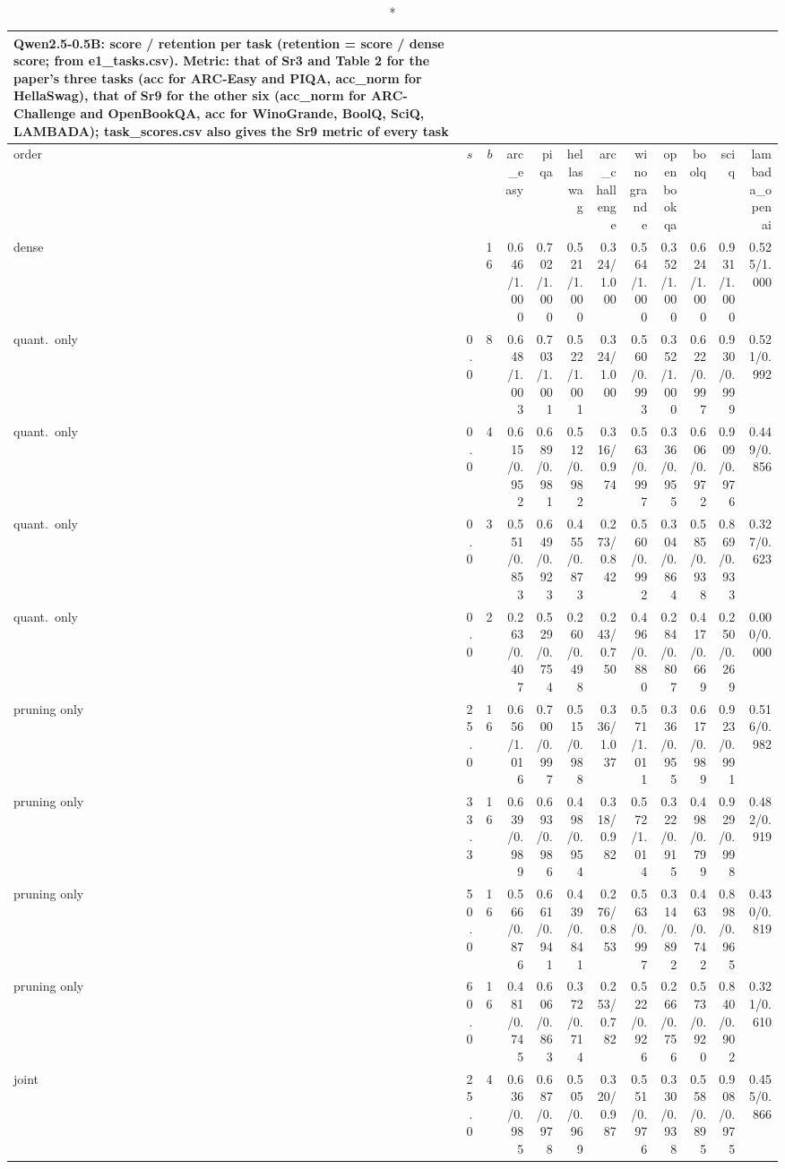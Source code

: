 \documentclass{article}
\begin{document}
\begin{longtable}{lrrrrrrrrrrr}
\caption*{Qwen2.5-0.5B: score / retention per task (retention = score / dense score; from e1\_tasks.csv). Metric: that of Sr3 and Table 2 for the paper's three tasks (acc for ARC-Easy and PIQA, acc\_norm for HellaSwag), that of Sr9 for the other six (acc\_norm for ARC-Challenge and OpenBookQA, acc for WinoGrande, BoolQ, SciQ, LAMBADA); task\_scores.csv also gives the Sr9 metric of every task}\\
\toprule order & $s$ & $b$ & arc\_easy & piqa & hellaswag & arc\_challenge & winogrande & openbookqa & boolq & sciq & lambada\_openai \\ \midrule \endhead
dense &  & 16 & 0.646/1.000 & 0.702/1.000 & 0.521/1.000 & 0.324/1.000 & 0.564/1.000 & 0.352/1.000 & 0.624/1.000 & 0.931/1.000 & 0.525/1.000 \\
quant.\ only & 0.0 & 8 & 0.648/1.003 & 0.703/1.001 & 0.522/1.001 & 0.324/1.000 & 0.560/0.993 & 0.352/1.000 & 0.622/0.997 & 0.930/0.999 & 0.521/0.992 \\
quant.\ only & 0.0 & 4 & 0.615/0.952 & 0.689/0.981 & 0.512/0.982 & 0.316/0.974 & 0.563/0.997 & 0.336/0.955 & 0.606/0.972 & 0.909/0.976 & 0.449/0.856 \\
quant.\ only & 0.0 & 3 & 0.551/0.853 & 0.649/0.923 & 0.455/0.873 & 0.273/0.842 & 0.560/0.992 & 0.304/0.864 & 0.585/0.938 & 0.869/0.933 & 0.327/0.623 \\
quant.\ only & 0.0 & 2 & 0.263/0.407 & 0.529/0.754 & 0.260/0.498 & 0.243/0.750 & 0.496/0.880 & 0.284/0.807 & 0.417/0.669 & 0.250/0.269 & 0.000/0.000 \\
pruning only & 25.0 & 16 & 0.656/1.016 & 0.700/0.997 & 0.515/0.988 & 0.336/1.037 & 0.571/1.011 & 0.336/0.955 & 0.617/0.989 & 0.923/0.991 & 0.516/0.982 \\
pruning only & 33.3 & 16 & 0.639/0.989 & 0.693/0.986 & 0.498/0.954 & 0.318/0.982 & 0.572/1.014 & 0.322/0.915 & 0.498/0.799 & 0.929/0.998 & 0.482/0.919 \\
pruning only & 50.0 & 16 & 0.566/0.876 & 0.661/0.941 & 0.439/0.841 & 0.276/0.853 & 0.563/0.997 & 0.314/0.892 & 0.463/0.742 & 0.898/0.965 & 0.430/0.819 \\
pruning only & 60.0 & 16 & 0.481/0.745 & 0.606/0.863 & 0.372/0.714 & 0.253/0.782 & 0.522/0.926 & 0.266/0.756 & 0.573/0.920 & 0.840/0.902 & 0.321/0.610 \\
joint & 25.0 & 4 & 0.636/0.985 & 0.687/0.978 & 0.505/0.969 & 0.320/0.987 & 0.551/0.976 & 0.330/0.938 & 0.558/0.895 & 0.908/0.975 & 0.455/0.866 \\

\end{longtable}
\end{document}
